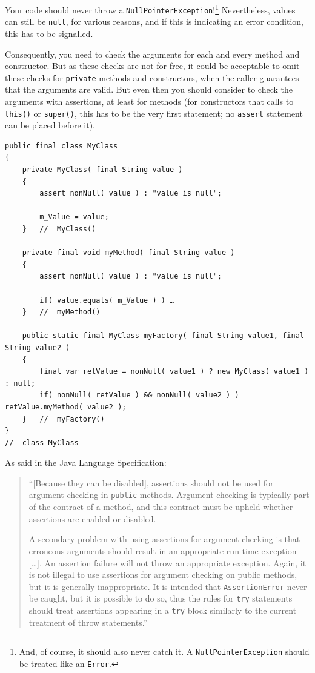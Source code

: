 \documentclass[11pt,a4paper, titlepage, parskip=half, headsepline, footsepline, cleardoublepage=current, headheight=1cm]{scrbook}
\begin{document}
Your code should never throw a \lstinline|NullPointerException|!\footnote{And, of course, it should also never catch it. A \lstinline|NullPointerException| should be treated like an \lstinline|Error|.} Nevertheless, values can still be \lstinline|null|, for various reasons, and if this is indicating an error condition, this has to be signalled.

Consequently, you need to check the arguments for each and every method and constructor. But as these checks are not for free, it could be acceptable to omit these checks for \lstinline|private| methods and constructors, when the caller guarantees that the arguments are valid. But even then you should consider to check the arguments with assertions\autocite{ORACLE_DOC_LANGUAGE_SPECIFICATION:Assert, ORACLE_DOC_ASSERTIONS}, at least for methods (for constructors that calls to \lstinline|this()| or \lstinline|super()|, this has to be the very first statement; no \lstinline|assert| statement can be placed before it).

\begin{lstlisting}
public final class MyClass
{
    private MyClass( final String value )
    {
        assert nonNull( value ) : "value is null";
        
        m_Value = value;
    }   //  MyClass()
    
    private final void myMethod( final String value )
    {
        assert nonNull( value ) : "value is null";
        
        if( value.equals( m_Value ) ) …
    }   //  myMethod()
    
    public static final MyClass myFactory( final String value1, final String value2 )
    {
    	final var retValue = nonNull( value1 ) ? new MyClass( value1 ) : null;
    	if( nonNull( retValue ) && nonNull( value2 ) ) retValue.myMethod( value2 );
    }   //  myFactory()
}
//  class MyClass
\end{lstlisting}
As said in the Java Language Specification\autocite{ORACLE_DOC_LANGUAGE_SPECIFICATION:Assert}:
\begin{quotation}
“[Because they can be disabled], assertions should not be used for argument checking in \lstinline|public| methods. Argument checking is typically part of the contract of a method, and this contract must be upheld whether assertions are enabled or disabled.

A secondary problem with using assertions for argument checking is that erroneous arguments should result in an appropriate run-time exception […]. An assertion failure will not throw an appropriate exception. Again, it is not illegal to use assertions for argument checking on public methods, but it is generally inappropriate. It is intended that \lstinline|AssertionError| never be caught, but it is possible to do so, thus the rules for \lstinline|try| statements should treat assertions appearing in a \lstinline|try| block similarly to the current treatment of throw statements.”
\end{quotation}
\end{document}
